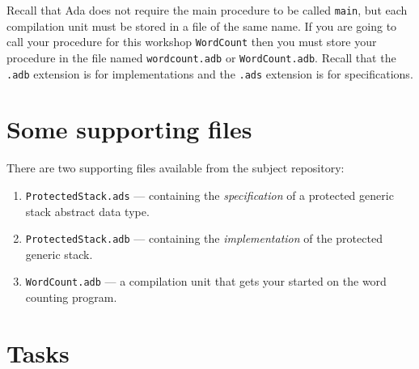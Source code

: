 \documentclass{article}
\begin{document}
Recall that Ada does not require the main procedure to be called \texttt{main}, but each compilation unit must be stored in a file of the same name. If you are going to call your procedure for this workshop \texttt{WordCount} then you must store your procedure in the file named \texttt{wordcount.adb} or \texttt{WordCount.adb}. Recall that the \texttt{.adb} extension is for implementations and the \texttt{.ads} extension is for specifications.

\section*{Some supporting files}
\label{section:files}

There are two  supporting files available from the subject repository:

\begin{enumerate}

  \item \texttt{ProtectedStack.ads} --- containing the {\em specification} of a
    protected generic stack abstract data type.

  \item \texttt{ProtectedStack.adb} --- containing the {\em implementation} of the protected generic stack.

  \item \texttt{WordCount.adb} --- a compilation unit that gets your started on the word counting program.
 
\end{enumerate}



\section*{Tasks}
\end{document}
